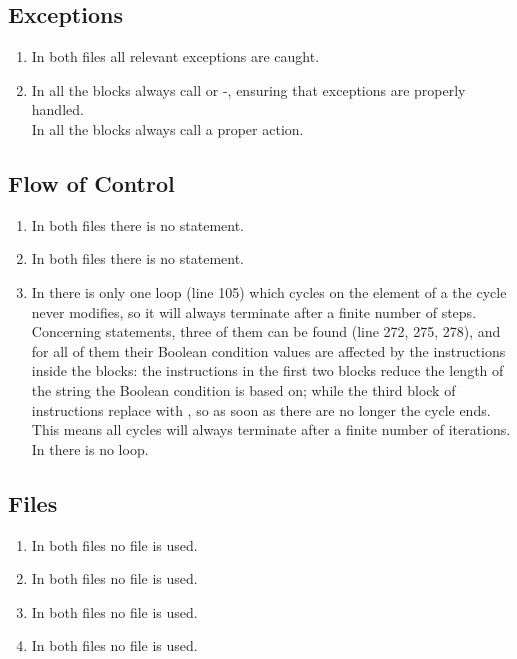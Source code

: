 \subsection{Exceptions}
\begin{enumerate}[NUM]
    \item In both files all relevant exceptions are caught.
    
    \item  In  all the  blocks always call  or -, ensuring that exceptions are properly handled.\\
    In  all the  blocks always call a proper action.
\end{enumerate}

\subsection{Flow of Control}
\begin{enumerate}[NUM]
    \item In both files there is no  statement.
    
    \item In both files there is no  statement.
    
    \item In  there is only one  loop (line 105) which cycles on the element of a  the cycle never modifies, so it will always terminate after a finite number of steps. Concerning  statements, three of them can be found (line 272, 275, 278), and for all of them their Boolean condition values are affected by the instructions inside the  blocks: the instructions in the first two blocks reduce the length of the string the Boolean condition is based on; while the third block of instructions replace \code{-}\code{-} with \code{-}, so as soon as there are no longer \code{-}\code{-} the cycle ends. This means all cycles will always terminate after a finite number of iterations.\\
    In  there is no loop.
\end{enumerate}

\subsection{Files}
\begin{enumerate}[NUM]
    \item In both files no file is used.
    
    \item In both files no file is used.
    
    \item In both files no file is used.
    
    \item In both files no file is used.
\end{enumerate}